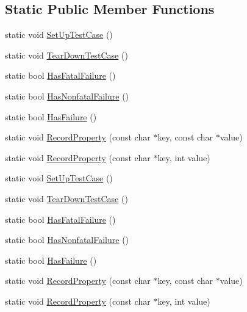 \subsection*{\-Static \-Public \-Member \-Functions}
\begin{DoxyCompactItemize}
\item 
static void \hyperlink{classtesting_1_1Test_aad8181b222f27240e9f07dcb6e620fa3}{\-Set\-Up\-Test\-Case} ()
\item 
static void \hyperlink{classtesting_1_1Test_aaff0dc66f57f643a49ad3dd6bcb56916}{\-Tear\-Down\-Test\-Case} ()
\item 
static bool \hyperlink{classtesting_1_1Test_a4f237fa994f623a704494cd821fb761f}{\-Has\-Fatal\-Failure} ()
\item 
static bool \hyperlink{classtesting_1_1Test_a015d02d8208675a344c7fc42c14838b7}{\-Has\-Nonfatal\-Failure} ()
\item 
static bool \hyperlink{classtesting_1_1Test_a627f8999d1cd6075cf76329d5470a666}{\-Has\-Failure} ()
\item 
static void \hyperlink{classtesting_1_1Test_a617793a25c9237119bf7f6235c27e360}{\-Record\-Property} (const char $\ast$key, const char $\ast$value)
\item 
static void \hyperlink{classtesting_1_1Test_a91974e2b5e9561476691aba94fb87689}{\-Record\-Property} (const char $\ast$key, int value)
\item 
static void \hyperlink{classtesting_1_1Test_aad8181b222f27240e9f07dcb6e620fa3}{\-Set\-Up\-Test\-Case} ()
\item 
static void \hyperlink{classtesting_1_1Test_aaff0dc66f57f643a49ad3dd6bcb56916}{\-Tear\-Down\-Test\-Case} ()
\item 
static bool \hyperlink{classtesting_1_1Test_aa75857373f536ac79308d69fa3404a78}{\-Has\-Fatal\-Failure} ()
\item 
static bool \hyperlink{classtesting_1_1Test_a7ffabea33b905822a1bc3fa19938e258}{\-Has\-Nonfatal\-Failure} ()
\item 
static bool \hyperlink{classtesting_1_1Test_a627f8999d1cd6075cf76329d5470a666}{\-Has\-Failure} ()
\item 
static void \hyperlink{classtesting_1_1Test_a2f037925b207081997a018191f833422}{\-Record\-Property} (const char $\ast$key, const char $\ast$value)
\item 
static void \hyperlink{classtesting_1_1Test_ab9182858c7a22a701cf711fb5ea485a0}{\-Record\-Property} (const char $\ast$key, int value)
\end{DoxyCompactItemize}
